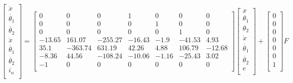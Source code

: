 \documentclass[a4paper, 10pt]{report}
\begin{document}
\begin{equation*}
\begin{bmatrix}
\dot{x} \\
\dot{\theta_{1}}\\
\dot{\theta_{2}}\\
\ddot{x}\\
\ddot{\theta_{1}}\\
\ddot{\theta_{2}}\\
i_{n}\\
\end{bmatrix}
=
\begin{bmatrix}
0 & 0 & 0 & 1 & 0 & 0 & 0\\
0 & 0 & 0 & 0 & 1 & 0 & 0\\
0 & 0 & 0 & 0 & 0 & 1 & 0\\
-13.65 & 161.07 & -255.27 & -16.43 & -1.9 & -41.53 & 4.93\\
35.1 & -363.74 & 631.19 & 42.26 & 4.88 & 106.79 & -12.68\\
-8.36 & 44.56 & -108.24 & -10.06 & -1.16 & -25.43 & 3.02\\
-1 & 0 & 0 & 0 & 0 & 0 & 0\\
\end{bmatrix}
\begin{bmatrix}
x \\
\theta_{1}\\
\theta_{2}\\
\dot{x}\\
\dot{\theta_{1}}\\
\dot{\theta_{2}}\\
e\\
\end{bmatrix}
+
\begin{bmatrix}
0\\
0\\
0\\
0\\
0\\
0\\
1\\
\end{bmatrix}
F
\end{equation*}
\end{document}
